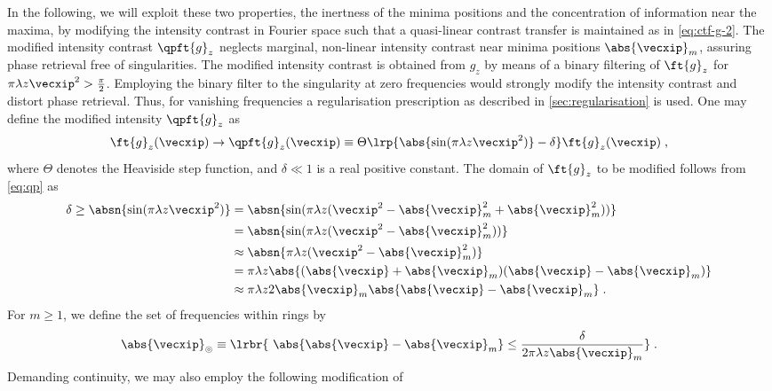 \documentclass[
twoside,
openright,
titlepage,
numbers=noenddot,
headinclude,
fleqn,
a4paper,
footinclude=true,
cleardoublepage=empty,
abstractoff,
BCOR=5mm,
paper=a4,
fontsize=11pt,
british,ngerman,american,
]{scrreprt}
\begin{document}
In the following, we will exploit these two properties, the inertness
of the minima positions and the concentration of information near the
maxima, by modifying the intensity contrast in Fourier space such that
a quasi-linear contrast transfer is maintained as in
\cref{eq:ctf-g-2}.  The modified intensity contrast $\qpft{g}_z$
neglects marginal, non-linear intensity contrast near minima positions
$\abs{\vecxip}_{m}$, assuring phase retrieval free of singularities.
The modified intensity contrast is obtained from $g_z$ by means of a
binary filtering of $\ft{g}_z$ for $\pi\lambda
z\vecxip^2>\frac{\pi}{2}$.  Employing the binary filter to the
singularity at zero frequencies would strongly modify the intensity
contrast and distort phase retrieval.  Thus, for vanishing frequencies
a regularisation prescription as described in
\cref{sec:regularisation} is used.  One may define the modified
intensity $\qpft{g}_z$ as
\begin{equation}
  \label{eq:qp}
  \ft{g}_z(\vecxip) \to  \qpft{g}_z(\vecxip) \equiv
  \Theta\lrp{\abs{\sin(\pi\lambda z\vecxip^2)} - \delta} 
  \ft{g}_z(\vecxip) \;,
\end{equation}
where $\Theta$ denotes the Heaviside step function, and $\delta\ll1$
is a real positive constant.  The domain of $\ft{g}_z$ to be modified
follows from \cref{eq:qp} as
\begin{equation}
  \label{eq:rings-derivation}
  \begin{split}
    \delta\ge \absn{ \sin(\pi\lambda z\vecxip^2) } 
    & = \absn{\sin(\pi\lambda z
     (\vecxip^2-\abs{\vecxip}^2_m +\abs{\vecxip}^2_m))}
 \\ & = \absn{\sin(\pi\lambda z(\vecxip^2-\abs{\vecxip}^2_m))}
 \\ & \approx \absn{\pi\lambda z(\vecxip^2-\abs{\vecxip}^2_m)}
 \\ & = \pi\lambda z\abs{(\abs{\vecxip}+\abs{\vecxip}_m)
  (\abs{\vecxip}-\abs{\vecxip}_m)} 
 \\ &\approx \pi\lambda z 2 \abs{\vecxip}_m 
    \abs{\abs{\vecxip}-\abs{\vecxip}_m} \;.
  \end{split}
\end{equation}
For $m\ge1$, we define the set of frequencies within rings by
\begin{equation}
  \label{eq:rings}
  \abs{\vecxip}_\circledcirc \equiv \lrbr{\
   \abs{ \abs{\vecxip} - \abs{\vecxip}_m } \le 
  \frac{\delta}{2\pi\lambda z \abs{\vecxip}_m} }\;.
\end{equation}
Demanding continuity, we may also employ the following modification of
\end{document}
